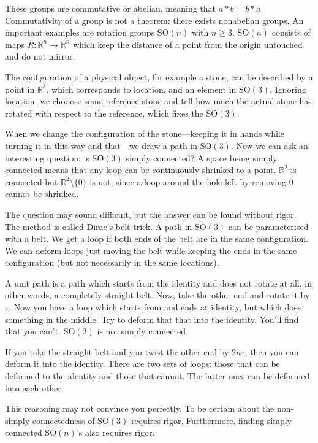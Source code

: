 \documentclass[11pt,oneside,%
]{memoir}
\theoremstyle{definition}
\newcommand{\RR}{\mathbb{R}}
\begin{document}
These groups are commutative or abelian, meaning that \(a*b=b*a\). Commutativity of a group is not a theorem: there exists nonabelian groups. An important examples are rotation groups \(\mathrm{SO}(n)\) with \(n\geq3\). \(\mathrm{SO}(n)\) consists of maps \(R:\RR^n\rightarrow\RR^n\) which keep the distance of a point from the origin untouched and do not mirror.%

The configuration of a physical object, for example a stone, can be described by a point in \(\RR^3\), which corresponds to location, and an element in \(\mathrm{SO}(3)\). Ignoring location, we chooose some reference stone and tell how much the actual stone has rotated with respect to the reference, which fixes the \(\mathrm{SO}(3)\).

When we change the configuration of the stone---keeping it in hands while turning it in this way and that---we draw a path in \(\mathrm{SO}(3)\). Now we can ask an interesting question: is \(\mathrm{SO}(3)\) simply connected? A space being simply connected means that any loop can be continuously shrinked to a point. \(\RR^2\) is connected but \(\RR^2\setminus\lbrace0\rbrace\) is not, since a loop around the hole left by removing \(0\) cannot be shrinked.

The question may sound difficult, but the answer can be found without rigor. The method is called Dirac's belt trick. A path in \(\mathrm{SO}(3)\) can be parameterised with a belt. We get a loop if both ends of the belt are in the same configuration. We can deform loops just moving the belt while keeping the ends in the same configuration (but not necessarily in the same locations).

A unit path is a path which starts from the identity and does not rotate at all, in other words, a completely straight belt. Now, take the other end and rotate it by \(\tau\). Now you have a loop which starts from and ends at identity, but which does something in the middle. Try to deform that that into the identity. You'll find that you can't. \(\mathrm{SO}(3)\) is not simply connected.

If you take the straight belt and you twist the other end by \(2n\tau\), then you can deform it into the identity. There are two sets of loops: those that can be deformed to the identity and those that cannot. The latter ones can be deformed into each other.

This reasoning may not convince you perfectly. To be certain about the non-simply connectedness of \(\mathrm{SO}(3)\) requires rigor. Furthermore, finding simply connected \(\mathrm{SO}(n)\)'s also requires rigor.
\end{document}

